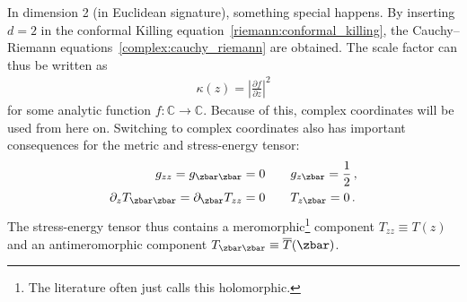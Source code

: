     In dimension 2 (in Euclidean signature), something special happens. By inserting $d=2$ in the conformal Killing equation~\eqref{riemann:conformal_killing}, the Cauchy--Riemann equations~\ref{complex:cauchy_riemann} are obtained. The scale factor can thus be written as
    \begin{gather}
        \kappa(z) = \left|\frac{\partial f}{\partial z}\right|^2
    \end{gather}
    for some analytic function $f:\mathbb{C}\rightarrow\mathbb{C}$. Because of this, complex coordinates will be used from here on. Switching to complex coordinates also has important consequences for the metric and stress-energy tensor:
    \begin{gather}
        \begin{aligned}
            g_{zz} = g_{\zbar\zbar} = 0&\qquad g_{z\zbar} = \frac{1}{2}\,,\\
            \partial_zT_{\zbar\zbar} = \partial_{\zbar} T_{zz} = 0&\qquad T_{z\zbar} = 0\,.
        \end{aligned}
    \end{gather}
    The stress-energy tensor thus contains a meromorphic\footnote{The literature often just calls this holomorphic.} component $T_{zz}\equiv T(z)$ and an antimeromorphic component $T_{\zbar\zbar}\equiv\overline{T}(\zbar)$.


